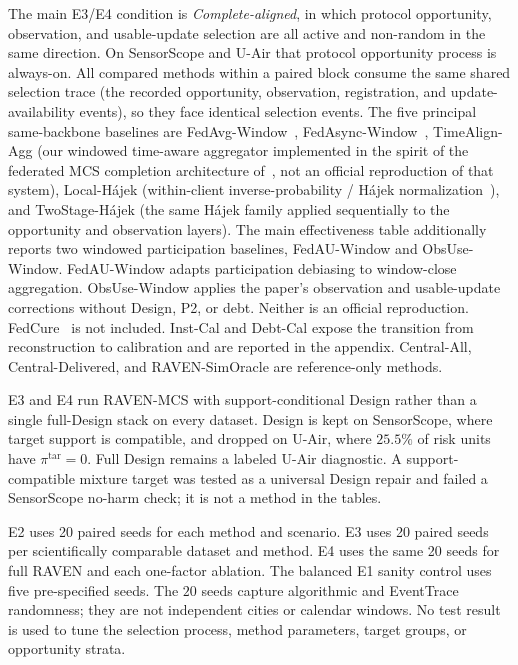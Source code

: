\documentclass[letterpaper,journal]{IEEEtran}
\begin{document}
The main E3/E4 condition is \emph{Complete-aligned}, in which protocol
opportunity, observation, and usable-update selection are all active and
non-random in the same direction.  On SensorScope and U-Air that protocol
opportunity process is always-on.  All compared methods within a paired block consume the same
shared selection trace (the recorded opportunity, observation, registration,
and update-availability events), so they face identical selection events.
The five principal same-backbone baselines are
FedAvg-Window~\cite{mcmahan2017communication},
FedAsync-Window~\cite{xie2019asynchronous},
TimeAlign-Agg (our windowed time-aware aggregator implemented in the spirit of
the federated MCS completion architecture of~\cite{wang2026federated}, not an
official reproduction of that system),
Local-H\'ajek (within-client inverse-probability / H\'ajek
normalization~\cite{horvitz1952generalization,hajek1971comment}), and
TwoStage-H\'ajek (the same H\'ajek family applied sequentially to the
opportunity and observation layers).  The main effectiveness table additionally
reports two windowed participation baselines, FedAU-Window and
ObsUse-Window.  FedAU-Window adapts participation debiasing
\cite{wang2024lightweight} to window-close aggregation.
ObsUse-Window applies the paper's observation and usable-update
corrections without Design, P2, or debt.  Neither is an official
reproduction.  FedCure~\cite{chen2026fedcure} is not included.  Inst-Cal and Debt-Cal
expose the transition from reconstruction to calibration and are
reported in the appendix.  Central-All, Central-Delivered, and
RAVEN-SimOracle are reference-only methods.

E3 and E4 run RAVEN-MCS with support-conditional Design rather than a
single full-Design stack on every dataset.  Design is kept on SensorScope,
where target support is compatible, and dropped on U-Air, where $25.5\%$ of
risk units have $\pi^{\mathrm{tar}}=0$.  Full Design remains a labeled
U-Air diagnostic.  A support-compatible mixture target was tested as a
universal Design repair and failed a SensorScope no-harm check; it is not a
method in the tables.

E2 uses 20 paired seeds for each method and scenario.  E3 uses 20 paired seeds
per scientifically comparable dataset and method.  E4 uses the same 20 seeds
for full RAVEN and each one-factor ablation.  The balanced E1 sanity control
uses five pre-specified seeds.  The $20$ seeds capture algorithmic and
EventTrace randomness; they are not independent cities or calendar windows.
No test result is used to tune the selection process,
method parameters, target groups, or opportunity strata.
\end{document}
